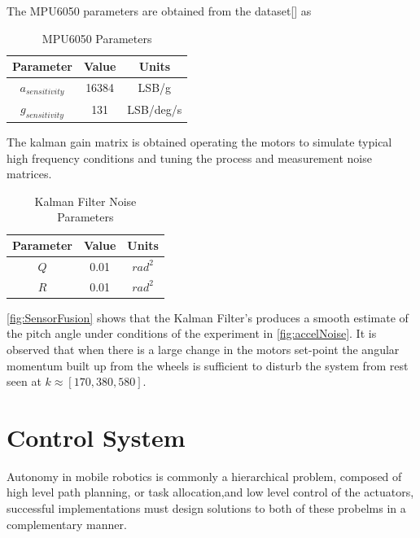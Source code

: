         The MPU6050 parameters are obtained from the dataset[] as 
        \begin{table}[H]
            \centering
            \begin{tabular}{|c|c|c|}
                \hline
                Parameter & Value & Units \\
                \hline
                $a_{sensitivity}$ & 16384 & LSB/g \\
                $g_{sensitivity}$ & 131 & LSB/deg/s \\
                \hline
            \end{tabular}
            \caption{MPU6050 Parameters}
        \end{table}
        The kalman gain matrix is obtained operating the motors to simulate typical high frequency conditions 
        and tuning the process and measurement noise matrices.
        \begin{table}[H]
            \centering
            \begin{tabular}{|c|c|c|}
                \hline
                Parameter & Value & Units \\
                \hline
                $Q$ & 0.01 & $rad^2$ \\
                $R$ & 0.01 & $rad^2$ \\
                \hline
            \end{tabular}
            \caption{Kalman Filter Noise Parameters}
        \end{table}

       
        \ref{fig:SensorFusion} shows that the Kalman Filter's produces a smooth estimate of the pitch angle
        under conditions of the experiment in \ref{fig:accelNoise}. It is observed that when there is a 
        large change in the motors set-point  the angular momentum built up from the wheels is sufficient to 
        disturb the system from rest seen at $k \approx [170, 380, 580]$.
        \pagebreak{}
    \section{Control System}
        Autonomy in mobile robotics is commonly a hierarchical problem, composed of high level path planning, 
        or task allocation,and low level control of the actuators, successful implementations must design 
        solutions to both of these probelms in a complementary manner. 
               

